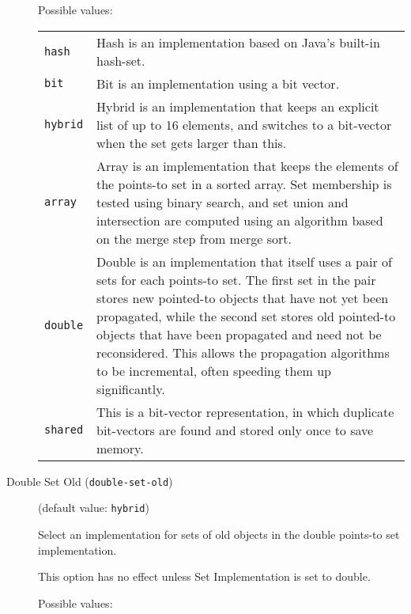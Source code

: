 \documentclass{article}
\begin{document}
\begin{description}
Possible values:\\
\begin{longtable}{p{1in}p{4in}}

{\tt hash }
&

Hash is an implementation based on Java's built-in hash-set.
\\

{\tt bit }
&

Bit is an implementation using a bit vector.
\\

{\tt hybrid }
&

Hybrid is an implementation that keeps an explicit list of up to
16 elements, and switches to a bit-vector when the set gets
larger than this.
\\

{\tt array }
&

Array is an implementation that keeps the elements of the
points-to set in a sorted array. Set membership is tested using
binary search, and set union and intersection are computed using
an algorithm based on the merge step from merge sort.
\\

{\tt double }
&

Double is an implementation that itself uses a pair of sets for
each points-to set. The first set in the pair stores new pointed-to
objects that have not yet been propagated, while the second set stores
old pointed-to objects that have been propagated and need not be
reconsidered. This allows the propagation algorithms to be incremental,
often speeding them up significantly.
\\

{\tt shared }
&
This is a bit-vector representation, in which duplicate bit-vectors are found and stored only once to save memory.\\

\end{longtable}


\item[Double Set Old ({\tt double-set-old})]
(default value: {\tt hybrid})




Select an implementation for sets of old objects in the double
points-to set implementation.

This option has no effect unless Set Implementation is set to double.
        



Possible values:\\
\begin{longtable}{p{1in}p{4in}}


\end{longtable}
\end{description}
\end{document}
